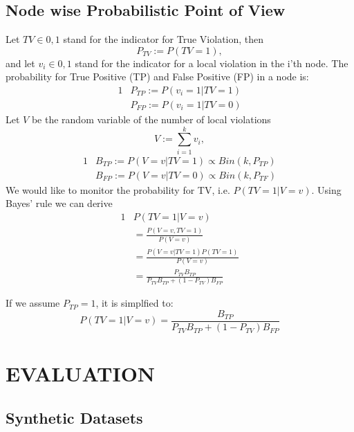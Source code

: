 \documentclass[11pt,twocolumn,varwidth=true,a4paper,fleqn]{article}
\begin{document}
\subsection{Node wise Probabilistic Point of View }
Let $TV \in {0,1}$ stand for the indicator for True
Violation, then  
\begin{equation*}
P_{TV} := P(TV = 1),
\end{equation*}
and let $v_i \in {0,1}$ stand for the indicator for a local violation in the
i'th node. The probability for True Positive (TP) and False Positive (FP) in a
node is:
\begin{alignat*}{1}
& P_{TP} := P(v_i=1 | TV=1) \\
& P_{FP} := P(v_i=1 | TV=0)
\end{alignat*}
Let $V$ be the random variable of the number of local violations
\begin{equation*}
V := \sum_{i=1}^k v_i,
\end{equation*}
\begin{alignat*}{1}
& B_{TP} := P(V=v | TV=1) \propto Bin(k,P_{TP}) \\
& B_{FP} := P(V=v | TV=0) \propto Bin(k,P_{TF})
\end{alignat*}
We would like to monitor the probability for TV, i.e. $P(TV=1|V=v)$. Using
Bayes' rule we can derive
\begin{alignat*}{1}
& P(TV=1|V=v) \\
& = \frac{P(V=v, TV=1)}{P(V=v)}\\
& = \frac{P(V=v|TV=1)P(TV=1)}{P(V=v)} \\
& = \frac{P_{TV}B_{TP}}{P_{TV}B_{TP} + (1-P_{TV})B_{FP}}
\end{alignat*}

If we assume $P_{TP}=1$, it is simplfied to:
\begin{equation*}
P(TV=1|V=v) = \frac{B_{TP}}{P_{TV}B_{TP} + (1-P_{TV})B_{FP}}
\end{equation*}
\section{EVALUATION}
\subsection{Synthetic Datasets}
\end{document}
